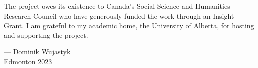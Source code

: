 The project owes its existence to Canada's Social Science and Humanities Research 
Council who have generously funded the work through an Insight Grant. I am grateful 
to my academic home, the University of Alberta, for hosting and supporting the 
project. 

{\flushright --- Dominik Wujastyk\\ Edmonton 2023\par}


%

% 
%
%
